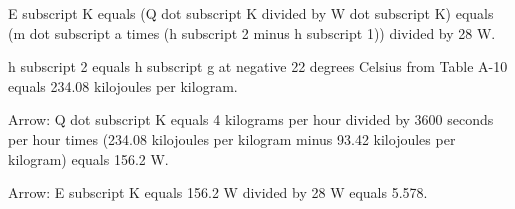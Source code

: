 E subscript K equals (Q dot subscript K divided by W dot subscript K) equals (m dot subscript a times (h subscript 2 minus h subscript 1)) divided by 28 W.  

h subscript 2 equals h subscript g at negative 22 degrees Celsius from Table A-10 equals 234.08 kilojoules per kilogram.  

Arrow: Q dot subscript K equals 4 kilograms per hour divided by 3600 seconds per hour times (234.08 kilojoules per kilogram minus 93.42 kilojoules per kilogram) equals 156.2 W.  

Arrow: E subscript K equals 156.2 W divided by 28 W equals 5.578.